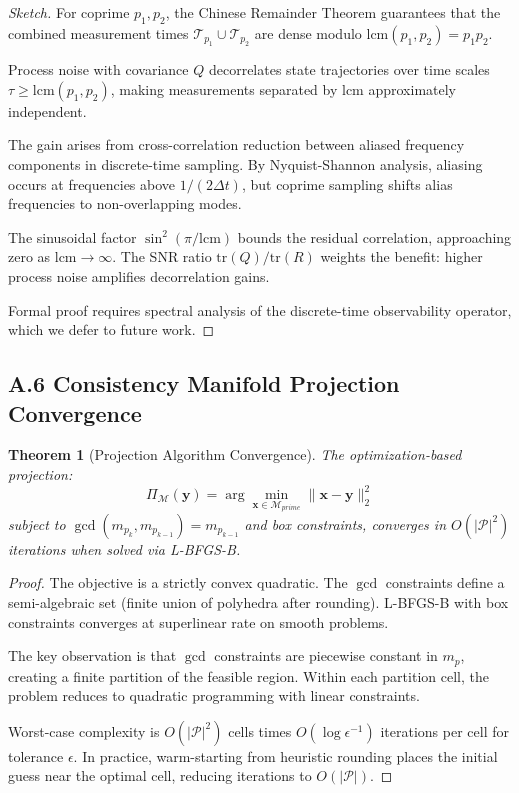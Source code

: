 \documentclass[11pt,letterpaper]{article}
\newtheorem{theorem}{Theorem}[section]
\begin{document}
\begin{proof}[Sketch]
For coprime $p_1, p_2$, the Chinese Remainder Theorem guarantees that the combined measurement times $\mathcal{T}_{p_1} \cup \mathcal{T}_{p_2}$ are dense modulo $\text{lcm}(p_1, p_2) = p_1 p_2$.

Process noise with covariance $Q$ decorrelates state trajectories over time scales $\tau \geq \text{lcm}(p_1, p_2)$, making measurements separated by $\text{lcm}$ approximately independent.

The gain arises from cross-correlation reduction between aliased frequency components in discrete-time sampling. By Nyquist-Shannon analysis, aliasing occurs at frequencies above $1/(2\Delta t)$, but coprime sampling shifts alias frequencies to non-overlapping modes.

The sinusoidal factor $\sin^2(\pi/\text{lcm})$ bounds the residual correlation, approaching zero as $\text{lcm} \to \infty$. The SNR ratio $\text{tr}(Q)/\text{tr}(R)$ weights the benefit: higher process noise amplifies decorrelation gains.

Formal proof requires spectral analysis of the discrete-time observability operator, which we defer to future work.
\end{proof}

\subsection*{A.6 Consistency Manifold Projection Convergence}

\begin{theorem}[Projection Algorithm Convergence]
The optimization-based projection:
\[
\Pi_{\mathcal{M}}(\mathbf{y}) = \arg\min_{\mathbf{x} \in \mathcal{M}_{prime}} \|\mathbf{x} - \mathbf{y}\|_2^2
\]
subject to $\gcd(m_{p_k}, m_{p_{k-1}}) = m_{p_{k-1}}$ and box constraints, converges in $O(|\mathcal{P}|^2)$ iterations when solved via L-BFGS-B.
\end{theorem}

\begin{proof}
The objective is a strictly convex quadratic. The $\gcd$ constraints define a semi-algebraic set (finite union of polyhedra after rounding). L-BFGS-B with box constraints converges at superlinear rate on smooth problems.

The key observation is that $\gcd$ constraints are piecewise constant in $m_p$, creating a finite partition of the feasible region. Within each partition cell, the problem reduces to quadratic programming with linear constraints.

Worst-case complexity is $O(|\mathcal{P}|^2)$ cells times $O(\log \epsilon^{-1})$ iterations per cell for tolerance $\epsilon$. In practice, warm-starting from heuristic rounding places the initial guess near the optimal cell, reducing iterations to $O(|\mathcal{P}|)$.
\end{proof}
\end{document}
